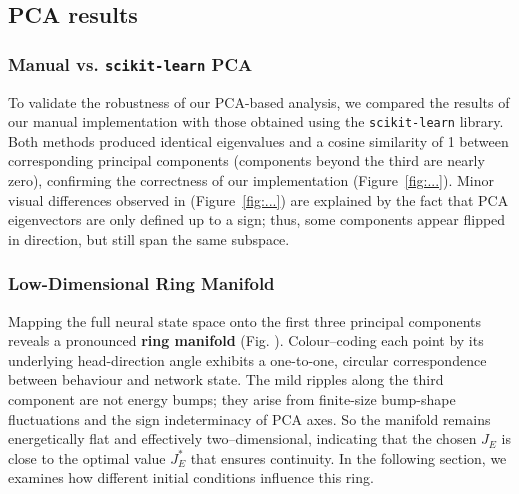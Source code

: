 \documentclass[11pt,a4paper]{article}
\begin{document}



\subsection{PCA results}

\subsubsection*{Manual vs. \texttt{scikit-learn} PCA}

To validate the robustness of our PCA-based analysis, we compared the results of our manual implementation with those obtained using the \texttt{scikit-learn} library. 
Both methods produced identical eigenvalues and a cosine similarity of 1 between corresponding principal components (components beyond the third are nearly zero), confirming the correctness of our implementation (Figure~\ref{fig:...}). Minor visual differences observed in (Figure~\ref{fig:...}) are explained by the fact that PCA eigenvectors are only defined up to a sign; thus, some components appear flipped in direction, but still span the same subspace.




\subsubsection*{Low-Dimensional Ring Manifold}

Mapping the full neural state space onto the first three principal components reveals a pronounced \textbf{ring manifold} (Fig. ).
Colour–coding each point by its underlying head-direction angle exhibits a one-to-one, circular correspondence between behaviour and network state. 
The mild ripples along the third component are not energy bumps; they arise from finite-size bump-shape fluctuations and the sign indeterminacy of PCA axes. 
So the manifold remains energetically flat and effectively two–dimensional, indicating that the chosen $J_E$ is close to the optimal value $J_E^{\ast}$ that ensures continuity. 
In the following section, we examines how different initial conditions influence this ring.
\end{document}
